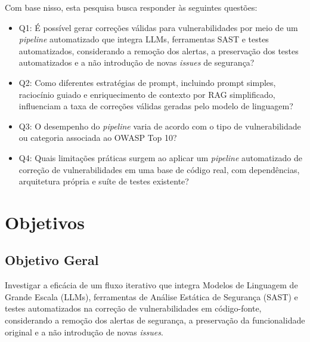 Com base nisso, esta pesquisa busca responder às seguintes questões:
\begin{itemize}
 \item Q1: É possível gerar correções válidas para vulnerabilidades por meio de um \textit{pipeline} automatizado que integra LLMs, ferramentas SAST e testes automatizados, considerando a remoção dos alertas, a preservação dos testes automatizados e a não introdução de novas \textit{issues} de segurança?
 \item Q2: Como diferentes estratégias de prompt, incluindo prompt simples, raciocínio guiado e enriquecimento de contexto por RAG simplificado, influenciam a taxa de correções válidas geradas pelo modelo de linguagem?
\item Q3: O desempenho do \textit{pipeline} varia de acordo com o tipo de vulnerabilidade ou categoria associada ao OWASP Top 10?
 \item Q4: Quais limitações práticas surgem ao aplicar um \textit{pipeline} automatizado de correção de vulnerabilidades em uma base de código real, com dependências, arquitetura própria e suíte de testes existente?
\end{itemize}

\section{Objetivos}
\subsection{Objetivo Geral}

Investigar a eficácia de um fluxo iterativo que integra Modelos de Linguagem de Grande Escala (LLMs), ferramentas de Análise Estática de Segurança (SAST) e testes automatizados na correção de vulnerabilidades em código-fonte, considerando a remoção dos alertas de segurança, a preservação da funcionalidade original e a não introdução de novas \textit{issues}.



